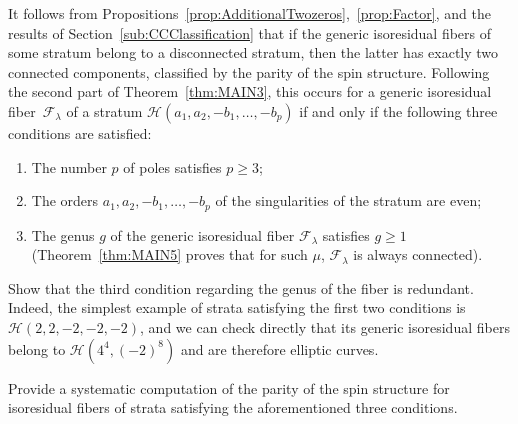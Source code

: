 It follows from Propositions~\ref{prop:AdditionalTwozeros},~\ref{prop:Factor}, and the results of Section~\ref{sub:CCClassification} that if the generic isoresidual fibers of some stratum belong to a disconnected stratum, then the latter has exactly two connected components, classified by the parity of the spin structure. Following the second part of Theorem~\ref{thm:MAIN3}, this occurs for a generic isoresidual fiber~$\mathcal{F}_{\lambda}$ of a stratum $\mathcal{H}(a_{1},a_{2},-b_{1},\dots,-b_{p})$ if and only if the following three conditions are satisfied:
\begin{enumerate}
\item The number $p$ of poles satisfies $p \geq 3$;
\item The orders $a_{1},a_{2},-b_{1},\dots,-b_{p}$ of the singularities of the stratum are even;
\item The genus $g$ of the generic isoresidual fiber $\mathcal{F}_{\lambda}$ satisfies $g \geq 1$ (Theorem~\ref{thm:MAIN5} proves that for such $\mu$, $\mathcal{F}_{\lambda}$ is always connected).
\end{enumerate}

\begin{opprob}
Show that the third condition regarding the genus of the fiber is redundant. Indeed, the simplest example of strata satisfying the first two conditions is $\mathcal{H}(2,2,-2,-2,-2)$, and we can check directly that its generic isoresidual fibers belong to $\mathcal{H}(4^{4},(-2)^{8})$ and are therefore elliptic curves.
\end{opprob}

\begin{opprob}
Provide a systematic computation of the parity of the spin structure for isoresidual fibers of strata satisfying the aforementioned three conditions.
\end{opprob}
